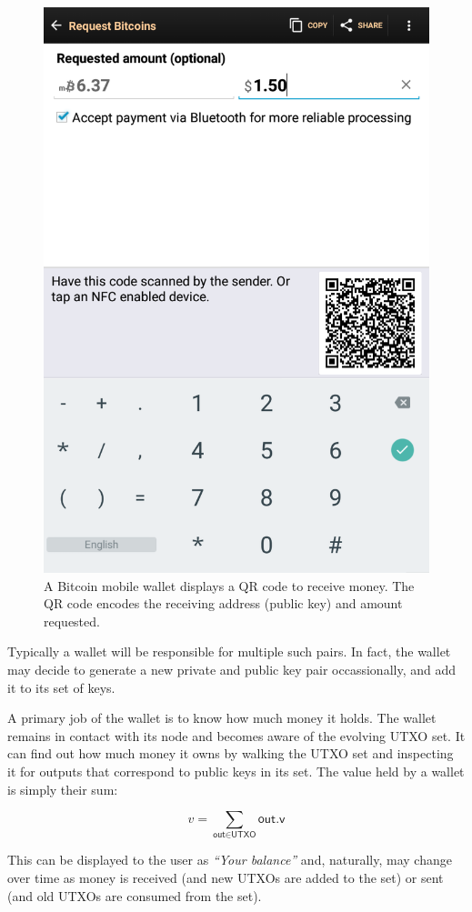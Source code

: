 \begin{figure}[h]
    \centering
    \includegraphics[width=0.6 \columnwidth,keepaspectratio]{figures/wallet-receive.png}
    \caption{A Bitcoin mobile wallet displays a QR code to receive money. The QR code encodes
             the receiving address (public key) and amount requested.}
    \label{fig.wallet-receive}
\end{figure}

Typically a wallet will be responsible for multiple
such pairs. In fact, the wallet may decide to generate a new private and public key pair occassionally,
and add it to its set of keys.

A primary job of the wallet is to know how much money it holds.
The wallet remains in contact with its node and becomes aware of the evolving UTXO set. It
can find out how much money it owns by walking the UTXO set and inspecting it for outputs that correspond
to public keys in its set. The value held by a wallet is simply their sum:

\[
  v = \sum_{\textsf{out} \in \textsf{UTXO}} \textsf{out.v}
\]

This can be displayed to the user as \emph{``Your balance''} and, naturally, may change over time
as money is received (and new UTXOs are added to the set) or sent (and old UTXOs are consumed from the set).

